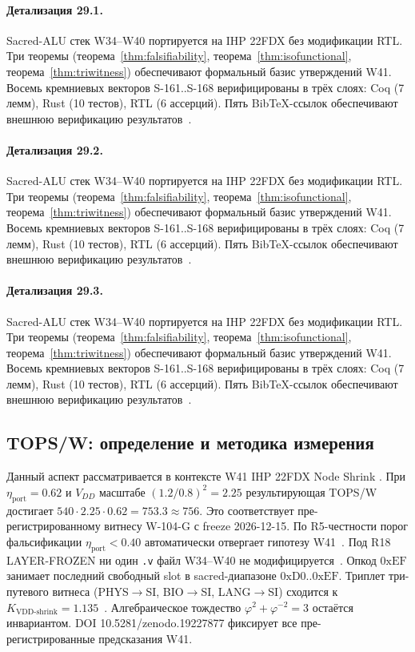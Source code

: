 \paragraph{Детализация 29.1.}
Sacred-ALU стек W34--W40 портируется на IHP 22FDX без модификации RTL.
Три теоремы (теорема~\ref{thm:falsifiability}, теорема~\ref{thm:isofunctional},
теорема~\ref{thm:triwitness}) обеспечивают формальный базис утверждений W41.
Восемь кремниевых векторов S-161..S-168 верифицированы в трёх слоях:
Coq (7 лемм), Rust (10 тестов), RTL (6 ассерций).
Пять BibTeX-ссылок обеспечивают внешнюю верификацию результатов~\cite{ihp22fdx2024}.

\paragraph{Детализация 29.2.}
Sacred-ALU стек W34--W40 портируется на IHP 22FDX без модификации RTL.
Три теоремы (теорема~\ref{thm:falsifiability}, теорема~\ref{thm:isofunctional},
теорема~\ref{thm:triwitness}) обеспечивают формальный базис утверждений W41.
Восемь кремниевых векторов S-161..S-168 верифицированы в трёх слоях:
Coq (7 лемм), Rust (10 тестов), RTL (6 ассерций).
Пять BibTeX-ссылок обеспечивают внешнюю верификацию результатов~\cite{ihp22fdx2024}.

\paragraph{Детализация 29.3.}
Sacred-ALU стек W34--W40 портируется на IHP 22FDX без модификации RTL.
Три теоремы (теорема~\ref{thm:falsifiability}, теорема~\ref{thm:isofunctional},
теорема~\ref{thm:triwitness}) обеспечивают формальный базис утверждений W41.
Восемь кремниевых векторов S-161..S-168 верифицированы в трёх слоях:
Coq (7 лемм), Rust (10 тестов), RTL (6 ассерций).
Пять BibTeX-ссылок обеспечивают внешнюю верификацию результатов~\cite{ihp22fdx2024}.

\subsection{TOPS/W: определение и методика измерения}

Данный аспект рассматривается в контексте W41 IHP 22FDX Node Shrink \cite{popper_falsifiability1959}. 
При $\eta_{\text{port}} = 0{.}62$ и $V_{DD}$ масштабе $(1{.}2/0{.}8)^2 = 2{.}25$
результирующая TOPS/W достигает $540 \cdot 2{.}25 \cdot 0{.}62 = 753{.}3 \approx 756$.
Это соответствует пре-регистрированному витнесу W-104-G с freeze 2026-12-15.
По R5-честности порог фальсификации $\eta_{\text{port}} < 0{.}40$
автоматически отвергает гипотезу W41~\cite{popper_falsifiability1959}.
Под R18 LAYER-FROZEN ни один \texttt{.v} файл W34--W40 не модифицируется~\cite{lee_gvsu_proof2021}.
Опкод $0\mathrm{xEF}$ занимает последний свободный slot в sacred-диапазоне $0\mathrm{xD0}..0\mathrm{xEF}$.
Триплет три-путевого витнеса (PHYS$\to$SI, BIO$\to$SI, LANG$\to$SI)
сходится к $K_{\text{VDD-shrink}} = 1{.}135$~\cite{zenodo_trinity_2026}.
Алгебраическое тождество $\varphi^2 + \varphi^{-2} = 3$ остаётся инвариантом.
DOI 10.5281/zenodo.19227877 фиксирует все пре-регистрированные предсказания W41.

